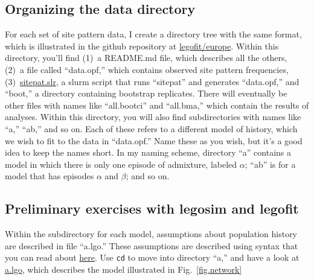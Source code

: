 \documentclass[11pt]{article}
\begin{document}
\subsection{Organizing the data directory}
For each set of site pattern data, I create a directory tree with the
same format, which is illustrated in the github repository at
\href{https://github.com/alanrogers/agar22/blob/main/legofit/europe}{legofit/europe}. Within
this directory, you'll find (1)~a README.md file, which describes all
the others, (2)~a file called ``data.opf,'' which contains observed
site pattern frequencies,
(3)~\href{https://alanrogers.github.io/agar22/legofit/sitepat.slr.html}{sitepat.slr},
a slurm script that runs ``sitepat'' and generates ``data.opf,'' and
``boot,'' a directory containing bootstrap replicates.  There will
eventually be other files with names like ``all.bootci'' and
``all.bma,'' which contain the results of analyses.  Within this
directory, you will also find subdirectories with names like ``a,''
``ab,'' and so on. Each of these refers to a different model of
history, which we wish to fit to the data in ``data.opf.''  Name these
as you wish, but it's a good idea to keep the names short. In my
naming scheme, directory ``a'' contains a model in which there is only
one episode of admixture, labeled $\alpha$; ``ab'' is for a model that
has episodes $\alpha$ and $\beta$; and so on.

\subsection{Preliminary exercises with legosim and legofit}
Within the subdirectory for each model, assumptions about population
history are described in file ``a.lgo.''  These assumptions are
described using syntax that you can read about
\href{http://alanrogers.github.io/legofit/html/index.html#lgo}{here}.
Use \texttt{cd} to move into directory ``a,'' and have a look at
\href{https://github.com/alanrogers/blob/main/agar22/legofit/europe/a/a.lgo}{a.lgo},
which describes the model illustrated in Fig.~\ref{fig.network}
\end{document}

